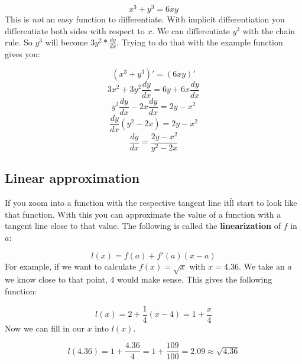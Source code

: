 \[x^3 + y^3 = 6xy\]
This is {\it not\/} an easy function to differentiate.
With implicit differentiation you differentiate both sides with respect to \(x\).
We can differentiate \(y^3\) with the chain rule.
So \(y^3\) will become \(3y^2 * \frac{dy}{dx}\).
Trying to do that with the example function gives you:

\[(x^3 + y^3)' = (6xy)'\]
\[3x^2 + 3y^2 \frac{dy}{dx} = 6y + 6x \frac{dy}{dx}\]
\[y^2 \frac{dy}{dx} - 2x \frac{dy}{dx} = 2y - x^2\]
\[\frac{dy}{dx}(y^2 - 2x) = 2y - x^2\]
\[\frac{dy}{dx} = \frac{2y - x^2}{y^2 - 2x}\]

\subsection{Linear approximation}
If you zoom into a function with the respective tangent line it\'ll start to look like that function.
With this you can approximate the value of a function with a tangent line close to that value.
The following is called the {\bf linearization} of \(f\) in \(a\):

\[l(x) = f(a) + f'(a)(x-a)\]
For example, if we want to calculate \(f(x) = \sqrt{x}\) with \(x = 4.36\).
We take an \(a\) we know close to that point, \(4\) would make sense.
This gives the following function:

\[l(x) = 2 + \frac{1}{4}(x - 4) = 1 + \frac{x}{4}\]
Now we can fill in our \(x\) into \(l(x)\).

\[l(4.36) = 1 + \frac{4.36}{4} = 1 + \frac{109}{100} = 2.09 \approx \sqrt{4.36}\]
